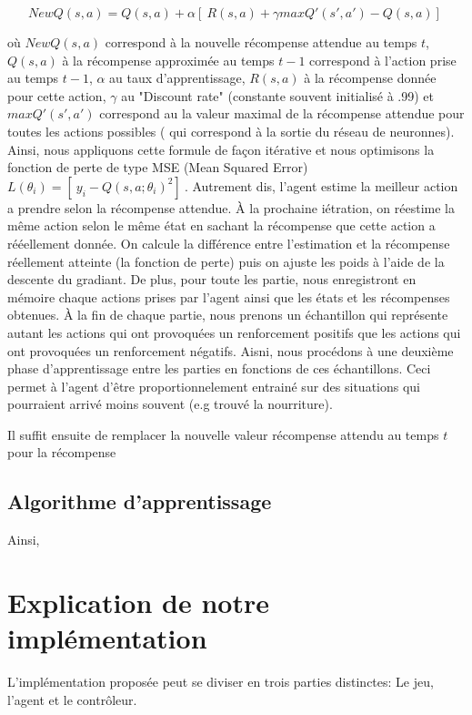 \documentclass{article}
\begin{document}
$$NewQ(s,a) = Q(s,a)  + \alpha [\ R(s,a) + \gamma maxQ{'} (s{'},a{'}) - Q(s,a) ]\ $$

où $NewQ(s,a) $ correspond à la nouvelle récompense attendue au temps $t$, $Q(s,a)$ à la récompense approximée au temps $t-1$ correspond à l'action prise au temps $t-1$, $\alpha$ au taux d'apprentissage, $R(s,a)$ à la récompense donnée pour cette action, $\gamma$ au "Discount rate" (constante souvent initialisé à .99) et $maxQ{'} (s{'},a{'})$ correspond au la valeur maximal de la récompense attendue pour toutes les actions possibles ( qui correspond à la sortie du réseau de neuronnes). Ainsi, nous appliquons cette formule de façon itérative et nous optimisons la fonction de perte de type MSE (Mean Squared Error)  $L( \theta_{i}) = [\ y_{i} - Q(s,a; \theta_{i})^{2} ]\ $. Autrement dis, l'agent estime la meilleur action a prendre selon la récompense attendue. À la prochaine iétration, on réestime la même action selon le même état en sachant la récompense que cette action a rééellement donnée. On calcule la différence entre l'estimation et la récompense réellement atteinte (la fonction de perte) puis on ajuste les poids à l'aide de la descente du gradiant. De plus, pour toute les partie, nous enregistront en mémoire chaque actions prises par l'agent ainsi que les états et les récompenses obtenues. À la fin de chaque partie, nous prenons un échantillon qui représente autant les actions qui ont provoquées un renforcement positifs que les actions qui ont provoquées un renforcement négatifs. Aisni, nous procédons à une deuxième phase d'apprentissage entre les parties en fonctions de ces échantillons. Ceci permet à l'agent d'être proportionnelement entrainé sur des situations qui pourraient arrivé moins souvent (e.g trouvé la nourriture). 

Il suffit ensuite de remplacer la nouvelle valeur récompense attendu au temps $t$ pour la récompense

\subsection{Algorithme d'apprentissage}



Ainsi, 
\section{Explication de notre implémentation}

L’implémentation proposée peut se diviser en trois parties distinctes: Le jeu, l’agent et le contrôleur.
\end{document}
